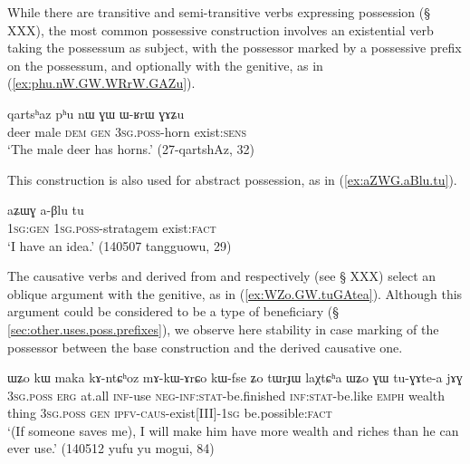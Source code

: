 While there are transitive and semi-transitive verbs expressing possession (§ XXX), the most common possessive construction involves an existential verb taking the possessum as subject, with the possessor marked by a possessive prefix on the possessum, and optionally with the genitive, as in (\ref{ex:phu.nW.GW.WRrW.GAZu}). 

\begin{exe}
\ex \label{ex:phu.nW.GW.WRrW.GAZu}
\gll qartsʰaz pʰu nɯ ɣɯ ɯ-ʁrɯ ɣɤʑu \\
deer male \textsc{dem} \textsc{gen} \textsc{3sg}.\textsc{poss}-horn exist:\textsc{sens} \\
\glt `The male deer has horns.' (27-qartshAz, 32)
\end{exe}

This construction is also used for abstract possession, as in (\ref{ex:aZWG.aBlu.tu}).

\begin{exe}
\ex \label{ex:aZWG.aBlu.tu}
\gll aʑɯɣ a-βlu tu \\
\textsc{1sg}:\textsc{gen} \textsc{1sg}.\textsc{poss}-stratagem exist:\textsc{fact} \\
\glt `I have an idea.' (140507 tangguowu, 29)
\end{exe}

The causative verbs  and  derived from  and  respectively (see § XXX) select an oblique argument with the genitive, as in (\ref{ex:WZo.GW.tuGAtea}). Although this argument could be considered to be a type of beneficiary (§ \ref{sec:other.uses.poss.prefixes}), we observe here stability in case marking of the possessor between the base construction and the derived causative one.

\begin{exe} 
\ex \label{ex:WZo.GW.tuGAtea} 
\gll ɯʑo kɯ maka kɤ-ntɕʰoz mɤ-kɯ-ɤrɕo kɯ-fse ʑo tɯrɟɯ laχtɕʰa ɯʑo ɣɯ tu-ɣɤte-a jɤɣ \\ 
\textsc{3sg}.\textsc{poss} \textsc{erg} at.all \textsc{inf}-use \textsc{neg}-\textsc{inf}:\textsc{stat}-be.finished \textsc{inf}:\textsc{stat}-be.like \textsc{emph} wealth thing \textsc{3sg}.\textsc{poss} \textsc{gen} \textsc{ipfv}-\textsc{caus}-exist[III]-\textsc{1sg} be.possible:\textsc{fact} \\ 
\glt `(If someone saves me), I will make him have more wealth and riches than he can ever use.' (140512 yufu yu mogui, 84) 
\end{exe} 

